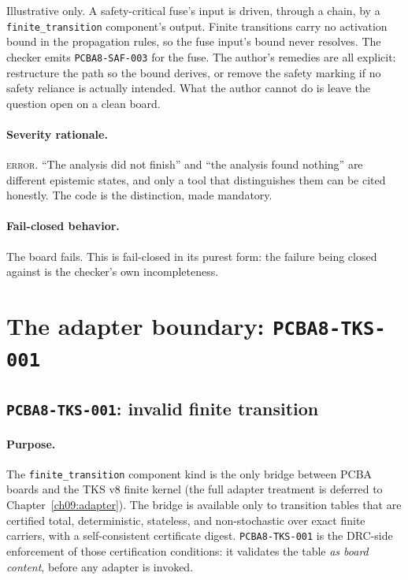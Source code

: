 \begin{example}\label{ch07:ex:saf003}
Illustrative only. A safety-critical fuse's input is driven, through a chain, by a \texttt{finite\_transition} component's output. Finite transitions carry no activation bound in the propagation rules, so the fuse input's bound never resolves. The checker emits \texttt{PCBA8-SAF-003} for the fuse. The author's remedies are all explicit: restructure the path so the bound derives, or remove the safety marking if no safety reliance is actually intended. What the author cannot do is leave the question open on a clean board.
\end{example}

\paragraph{Severity rationale.} \textsc{error}. ``The analysis did not finish'' and ``the analysis found nothing'' are different epistemic states, and only a tool that distinguishes them can be cited honestly. The code is the distinction, made mandatory.

\paragraph{Fail-closed behavior.} The board fails. This is fail-closed in its purest form: the failure being closed against is the checker's own incompleteness.

\section{The adapter boundary: \texttt{PCBA8-TKS-001}}\label{ch07:sec:tks}

\subsection{\texttt{PCBA8-TKS-001}: invalid finite transition}\label{ch07:sub:tks001}

\paragraph{Purpose.} The \texttt{finite\_transition} component kind is the only bridge between PCBA boards and the TKS v8 finite kernel (the full adapter treatment is deferred to Chapter~\ref{ch09:adapter}). The bridge is available only to transition tables that are certified total, deterministic, stateless, and non-stochastic over exact finite carriers, with a self-consistent certificate digest. \texttt{PCBA8-TKS-001} is the DRC-side enforcement of those certification conditions: it validates the table \emph{as board content}, before any adapter is invoked.

